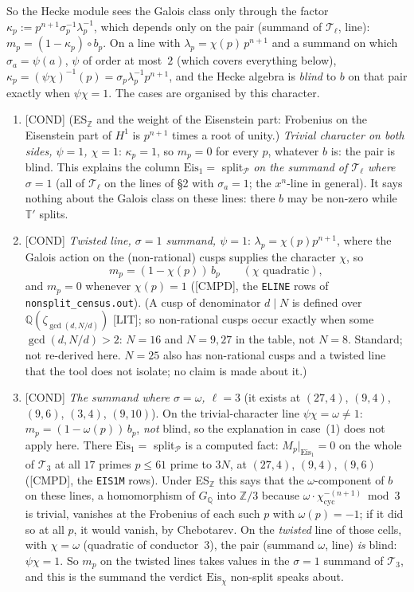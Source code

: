 \documentclass[11pt]{article}
\newcommand{\Z}{\mathbb{Z}}
\newcommand{\Q}{\mathbb{Q}}
\newcommand{\code}[1]{\texttt{#1}}
\newcommand{\file}[1]{\texttt{#1}}
\newcommand{\LIT}{\textsf{\small[LIT]}}
\newcommand{\CMPD}{\textsf{\small[CMPD]}}
\newcommand{\PGCOND}{\textsf{\small[COND]}}
\begin{document}
So the Hecke module sees the Galois class only through the factor $\kappa_p:=p^{n+1}\sigma_p^{-1}\lambda_p^{-1}$, which depends only on the pair (summand of $\mathcal T_\ell$, line): $m_p=(1-\kappa_p)\circ b_p$. On a line with $\lambda_p=\chi(p)\,p^{n+1}$ and a summand on which $\sigma_a=\psi(a)$, $\psi$ of order at most~$2$ (which covers everything below), $\kappa_p=(\psi\chi)^{-1}(p)=\sigma_p\lambda_p^{-1}p^{n+1}$, and the Hecke algebra is \emph{blind} to $b$ on that pair exactly when $\psi\chi=1$. The cases are organised by this character.
\begin{enumerate}[leftmargin=1.8em,itemsep=2pt]
\item \PGCOND{} (ES$_{\Z}$ and the weight of the Eisenstein part: Frobenius on the Eisenstein part of $H^{1}$ is $p^{n+1}$ times a root of unity.) \emph{Trivial character on both sides, $\psi=1$, $\chi=1$}: $\kappa_p=1$, so $m_p=0$ for every $p$, whatever $b$ is: the pair is blind. This explains the column $\mathrm{Eis}_1=$ split$_{\mathcal P}$ \emph{on the summand of $\mathcal T_\ell$ where $\sigma=1$} (all of $\mathcal T_\ell$ on the lines of \S2 with $\sigma_a=1$; the $x^{n}$-line in general). It says nothing about the Galois class on these lines: there $b$ may be non-zero while $\mathbb T'$ splits.
\item \PGCOND{} \emph{Twisted line, $\sigma=1$ summand, $\psi=1$}: $\lambda_p=\chi(p)p^{n+1}$, where the Galois action on the (non-rational) cusps supplies the character $\chi$, so
\[ m_p=(1-\chi(p))\,b_p \qquad(\text{$\chi$ quadratic}), \]
 and $m_p=0$ whenever $\chi(p)=1$ (\CMPD, the \code{ELINE} rows of \file{nonsplit\_census.out}). (A cusp of denominator $d\mid N$ is defined over $\Q(\zeta_{\gcd(d,N/d)})$ \LIT; so non-rational cusps occur exactly when some $\gcd(d,N/d)>2$: $N=16$ and $N=9,27$ in the table, not $N=8$. Standard; not re-derived here. $N=25$ also has non-rational cusps and a twisted line that the tool does not isolate; no claim is made about it.)
\item \PGCOND{} \emph{The summand where $\sigma=\omega$, $\ell=3$} (it exists at $(27,4)$, $(9,4)$, $(9,6)$, $(3,4)$, $(9,10)$). On the trivial-character line $\psi\chi=\omega\neq1$: $m_p=(1-\omega(p))\,b_p$, \emph{not} blind, so the explanation in case~(1) does not apply here. There $\mathrm{Eis}_1=$ split$_{\mathcal P}$ is a computed fact: $M_p|_{\mathrm{Eis}_1}=0$ on the whole of $\mathcal T_3$ at all $17$ primes $p\le61$ prime to $3N$, at $(27,4)$, $(9,4)$, $(9,6)$ (\CMPD, the \code{EIS1M} rows). Under ES$_\Z$ this says that the $\omega$-component of $b$ on these lines, a homomorphism of $G_\Q$ into $\Z/3$ because $\omega\cdot\chi_{\mathrm{cyc}}^{-(n+1)}\bmod3$ is trivial, vanishes at the Frobenius of each such $p$ with $\omega(p)=-1$; if it did so at all $p$, it would vanish, by Chebotarev. On the \emph{twisted} line of those cells, with $\chi=\omega$ (quadratic of conductor~$3$), the pair (summand $\omega$, line) \emph{is} blind: $\psi\chi=1$. So $m_p$ on the twisted lines takes values in the $\sigma=1$ summand of $\mathcal T_3$, and this is the summand the verdict $\mathrm{Eis}_\chi$ non-split speaks about.

\end{enumerate}
\end{document}
